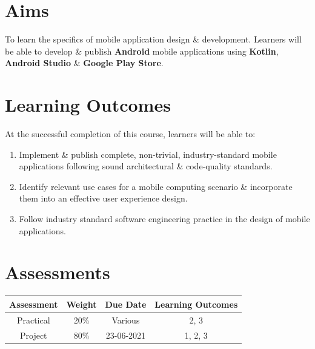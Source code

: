 \documentclass{article}
\begin{document}
\section*{Aims}
To learn the specifics of mobile application design \& development. Learners will be able to develop \& publish \textbf{Android} mobile applications using \textbf{Kotlin}, \textbf{Android Studio} \& \textbf{Google Play Store}.

\section*{Learning Outcomes}
At the successful completion of this course, learners will be able to: 
\begin{enumerate}
	\item Implement \& publish complete, non-trivial, industry-standard mobile applications following sound architectural \& code-quality standards.
	\item Identify relevant use cases for a mobile computing scenario \& incorporate them into an effective user experience design.
	\item Follow industry standard software engineering practice in the design of mobile applications.
\end{enumerate} 

\section*{Assessments}
\renewcommand{\arraystretch}{1.5}	
\begin{tabular}{|c|c|c|c|}
	\hline
	\textbf{Assessment} & \textbf{Weight} & \textbf{Due Date} & \textbf{Learning Outcomes} \\ \hline
	Practical           & 20\%            & Various           & 2, 3                       \\ \hline
	Project             & 80\%            & 23-06-2021        & 1, 2, 3                    \\ \hline
\end{tabular} 
\end{document}
